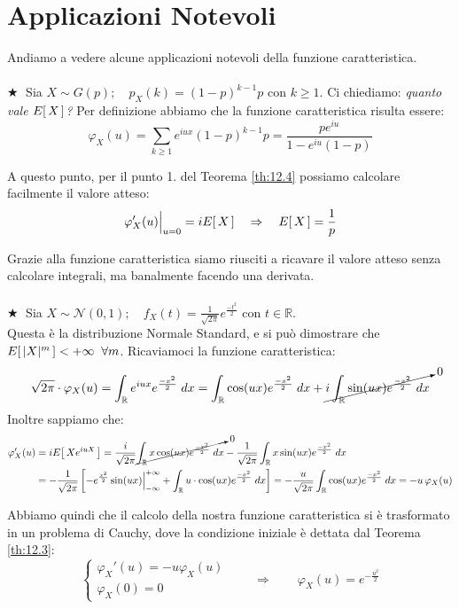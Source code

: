 \section{Applicazioni Notevoli}
Andiamo a vedere alcune applicazioni notevoli della funzione caratteristica.\\
\\
\(\bigstar \;\) Sia $X\sim G(p);\quad p_X(k) = (1-p)^{k-1}p$ con $k\geq1$. Ci chiediamo: \textit{quanto vale $E\!\left[\,X\,\right]$?} Per definizione abbiamo che la funzione caratteristica risulta essere:
\[\boxed{\varphi_X(u) = \sum_{k\geq1} e^{iux}(1-p)^{k-1}p = \frac{pe^{iu}}{1-e^{iu}(1-p)}}\]

A questo punto, per il punto 1. del Teorema \ref{th:12.4} possiamo calcolare facilmente il valore atteso:
\[\varphi_X'(u)\Big|_{u=0} = iE\!\left[\,X\,\right] \quad \Rightarrow\quad E\!\left[\,X\,\right] = \frac{1}{p}\]

Grazie alla funzione caratteristica siamo riusciti a ricavare il valore atteso senza calcolare integrali, ma banalmente facendo una derivata.\\
\\
\(\bigstar \;\) Sia $X\sim \mathcal{N}(0, 1);\quad f_X(t) = \frac{1}{\sqrt{2\pi}}e^{\frac{-t^2}{2}}$ con $t\in\mathbb{R}$. \\
Questa è la distribuzione Normale Standard, e si può dimostrare che $E\!\left[\,|X|^m\,\right]<+\infty\;\;\forall m$. Ricaviamoci la funzione caratteristica:
\begin{align*}
    \sqrt{2\pi}\cdot \varphi_X(u) = \int_\mathbb{R} e^{iux} e^{\frac{-x^2}{2}}\;dx = \int_\mathbb{R} \cos(ux) e^{\frac{-x^2}{2}}\;dx + \cancelto{0}{i \int_\mathbb{R} \sin(ux) e^{\frac{-x^2}{2}}\;dx}
\end{align*}
Inoltre sappiamo che:
\begin{align*}
    \varphi_X'(u) & = i E\!\left[\,Xe^{iuX}\,\right] = \frac{i}{\sqrt{2\pi}}\cancelto{0}{\int_\mathbb{R} x\cos(ux)e^{\frac{-x^2}{2}}\;dx} - \frac{1}{\sqrt{2\pi}}\int_\mathbb{R} x\sin(ux)e^{\frac{-x^2}{2}}\;dx\\
    & = - \frac{1}{\sqrt{2\pi}} \left[-e^{\frac{x^2}{2}} \sin(ux)\Big|_{-\infty}^{+\infty} + \int_\mathbb{R}u\cdot \cos(ux)e^{\frac{-x^2}{2}}\;dx\right] = - \frac{u}{\sqrt{2\pi}}\int_\mathbb{R}\cos(ux)e^{\frac{-x^2}{2}}\;dx = -u \,\varphi_X(u)
\end{align*}

Abbiamo quindi che il calcolo della nostra funzione caratteristica si è trasformato in un problema di Cauchy, dove la condizione iniziale è dettata dal Teorema \ref{th:12.3}:
\[\begin{cases}
    \varphi_X'(u) = -u \varphi_X(u)\\
    \varphi_X(0) = 0
\end{cases}\qquad \Rightarrow \qquad \boxed{\varphi_X(u) = e^{-\frac{u^2}{2}}}\]

